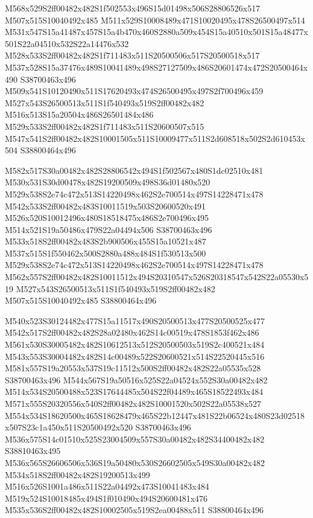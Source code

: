 \documentclass{article}
\begin{document}
\begin{multicols}{2}
M568x529S2ff00482x482S1f502553x496S15d01498x506S28806526x517 M507x515S10040492x485 M511x529S10008489x471S10020495x478S26500497x514 M531x547S15a41487x457S15a4b470x460S2880a509x454S15a40510x501S15a48477x501S22a04510x532S22a14476x532 M528x533S2ff00482x482S1f711483x511S20500506x517S20500518x517 M537x528S15a37476x489S10041489x498S27127509x486S20601474x472S20500464x490 S38700463x496 M509x541S10120490x511S17620493x474S26500495x497S2f700496x459 M527x543S26500513x511S1f540493x519S2ff00482x482 M516x513S15a20504x486S26501484x486 M529x533S2ff00482x482S1f711483x511S20600507x515 M547x541S2ff00482x482S10001505x511S10009477x511S2d608518x502S2d610453x504 S38800464x496

M582x517S30a00482x482S28806542x494S1f502567x480S1dc02510x481 M530x531S30d00478x482S19200509x498S36d01480x520 M529x538S2e74c472x513S14220498x462S2e700514x497S14228471x478 M542x533S2ff00482x483S10011519x503S20600520x491 M526x520S10012496x480S18518475x486S2e700496x495 M514x521S19a50486x479S22a04494x506 S38700463x496 M533x518S2ff00482x483S2b900506x455S15a10521x487 M537x515S1f550462x500S2880a488x484S1f530513x500 M529x538S2e74c472x513S14220498x462S2e700514x497S14228471x478 M562x557S2ff00482x482S10011512x494S20310547x526S20318547x542S22a05530x519 M527x543S26500513x511S1f540493x519S2ff00482x482 M507x515S10040492x485 S38800464x496

M540x523S30124482x477S15a11517x490S20500513x477S20500525x477 M542x517S2ff00482x482S28a02480x462S14c00519x478S1853f462x486 M561x530S30005482x482S10612513x512S20500503x519S2c400521x484 M543x553S30004482x482S14c00489x522S20600521x514S22520445x516 M581x557S19a20553x537S19c11512x500S2ff00482x482S22a05535x528 S38700463x496 M544x567S19a50516x525S22a04524x552S30a00482x482 M514x534S20500488x523S17644485x504S22f04489x465S18522493x484 M571x555S20320556x540S2ff00482x482S10001520x502S22a05538x527 M554x534S18620500x465S18628479x465S22b12447x481S22b06524x480S23d02518x507S23c1a450x511S20500492x520 S38700463x496 M536x575S14c01510x525S23004509x557S30a00482x482S34400482x482 S38810463x495 M536x565S26606506x536S19a50480x530S26602505x549S30a00482x482 M534x518S2ff00482x482S19200513x499 M516x526S1001a486x511S22a04492x473S10041483x484 M519x524S10018485x494S1f010490x494S20600481x476 M535x536S2ff00482x482S10002505x519S2ea00488x511 S38800464x496


\end{multicols}
\end{document}
